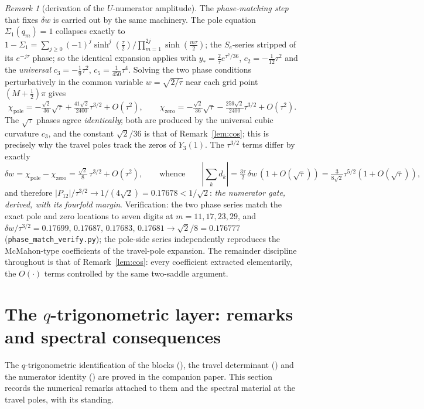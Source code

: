 \documentclass[11pt]{article}
\theoremstyle{plain}
\theoremstyle{definition}
\theoremstyle{remark}
\newtheorem{remark}[theorem]{Remark}
\begin{document}
\begin{remark}[derivation of the $U$-numerator amplitude]
The \emph{phase-matching step} that fixes $\delta w$ is carried out by the same machinery. The pole
equation $\Sigma_1(q_m)=1$ collapses exactly to
$1-\Sigma_1=\sum_{j\ge0}(-1)^j\sinh^j(\tfrac\tau2)/\prod_{m=1}^{2j}\sinh(\tfrac{m\tau}2)$; the
$S_e$-series stripped of its $e^{-j\tau}$ phase; so the identical expansion applies with
$y_*=\tfrac2\tau e^{\tau^2/36}$, $c_2=-\tfrac1{12}\tau^2$ and the \emph{universal} $c_3=-\tfrac19\tau^2$,
$c_5=\tfrac1{450}\tau^4$. Solving the two phase conditions perturbatively in the common variable
$w=\sqrt{2/\tau}$ near each grid point $(M+\tfrac12)\pi$ gives
\[
   \chi_{\mathrm{pole}}=-\tfrac{\sqrt2}{36}\sqrt\tau+\tfrac{41\sqrt2}{2400}\tau^{3/2}+O(\tau^2),
   \qquad
   \chi_{\mathrm{zero}}=-\tfrac{\sqrt2}{36}\sqrt\tau-\tfrac{259\sqrt2}{2400}\tau^{3/2}+O(\tau^2).
\]
The $\sqrt\tau$ phases agree \emph{identically}; both are produced by the universal cubic curvature
$c_3$, and the constant $\sqrt2/36$ is that of Remark~\ref{lem:cos}; this is precisely why the travel
poles track the zeros of $Y_3(1)$. The $\tau^{3/2}$ terms differ by exactly
\[
   \delta w=\chi_{\mathrm{pole}}-\chi_{\mathrm{zero}}=\tfrac{\sqrt2}8\,\tau^{3/2}+O(\tau^2),
   \qquad\text{whence}\qquad
   |\!\sum_kd_k|=\tfrac{3\tau}2\,\delta w\,(1+O(\sqrt\tau))=\tfrac3{8\sqrt2}\tau^{5/2}(1+O(\sqrt\tau)),
\]
and therefore $|P_{12}|/\tau^{3/2}\to1/(4\sqrt2)=0.17678<1/\sqrt2$: \emph{the numerator gate, derived,
with its fourfold margin}. Verification: the two phase series match the exact pole and zero locations to
seven digits at $m=11,17,23,29$, and $\delta w/\tau^{3/2}=0.17699,\,0.17687,\,0.17683,\,0.17681\to
\sqrt2/8=0.176777$ (\texttt{phase\_match\_verify.py}); the pole-side series independently reproduces the
McMahon-type coefficients of the travel-pole expansion. The remainder discipline throughout is that of
Remark~\ref{lem:cos}: every coefficient extracted elementarily, the $O(\cdot)$ terms controlled by the same
two-saddle argument.
\end{remark}

\section{The $q$-trigonometric layer: remarks and spectral consequences}\label{sec:qtrigremarks}

The $q$-trigonometric identification of the blocks ({\cite[Proposition \textup{prop:qtrig}]{Bonfioli2026bA}}), the travel
determinant ({\cite[Theorem ``the travel determinant'', \textup{thm:fredholm}]{Bonfioli2026bA}}) and the numerator identity
({\cite[Proposition ``the numerators do not vanish at the travel poles'', \textup{prop:numnonvanish}]{Bonfioli2026bA}}) are proved in the companion paper. This section records the
numerical remarks attached to them and the spectral material at the travel poles, with its
standing.
\end{document}
